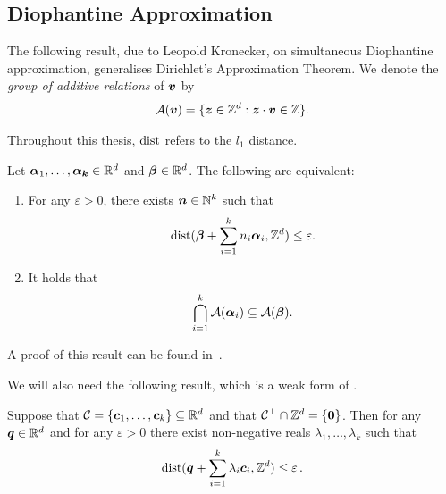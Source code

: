 \subsection{Diophantine Approximation}

The following result, due to Leopold Kronecker, on simultaneous Diophantine approximation, generalises Dirichlet's Approximation Theorem. We denote the \emph{group of additive relations} of $\boldsymbol{v}$ by
\begin{align*}
{\cal{A}}(\boldsymbol{v}) = \lbrace \boldsymbol{z} \in \mathbb{Z}^{d} : \boldsymbol{z} \cdot \boldsymbol{v} \in \mathbb{Z} \rbrace .
\end{align*}

Throughout this thesis, $\operatorname{dist}$ refers to the $l_{1}$ distance.

\begin{theorem}[Kronecker]
\label{thm:Kronecker}
Let $\boldsymbol{\alpha}_{1}, \ldots, \boldsymbol{\alpha_{k}} \in \mathbb{R}^{d}$ and $\boldsymbol{\beta} \in \mathbb{R}^{d}$. The following are equivalent:
\begin{enumerate}
\item For any $\varepsilon > 0$, there exists $\boldsymbol{n} \in \mathbb{N}^{k}$ such that
\begin{align*}
\operatorname{dist}(\boldsymbol{\beta} + \sum\limits_{i=1}^{k} n_{i} \boldsymbol{\alpha}_{i}, \mathbb{Z}^{d}) \leq \varepsilon .
\end{align*}
\item It holds that
\begin{align*}
\bigcap\limits_{i=1}^{k} {\cal{A}}(\boldsymbol{\alpha}_{i}) \subseteq {\cal{A}}(\boldsymbol{\beta}) .
\end{align*}
\end{enumerate}
\end{theorem}

A proof of this result can be found in~\cite{Cassels}.

We will also need the following result, which is a weak form of \cite[Corollary 2.8]{KhachiyanP97}.

\begin{theorem}
  \label{thm:kp-density}
  Suppose that $\mathcal{C} = \lbrace \boldsymbol{c}_{1}, \ldots, \boldsymbol{c}_{k} \rbrace \subseteq \mathbb{R}^{d}$ and that $\mathcal{C}^{\perp} \cap \mathbb{Z}^{d} = \lbrace \boldsymbol{0} \rbrace$. Then for any $\boldsymbol{q} \in \mathbb{R}^{d}$
  and for any $\varepsilon > 0$ there exist non-negative reals $\lambda_{1}, \ldots, \lambda_{k}$ such that
  \begin{equation*}
    \operatorname{dist}(\boldsymbol{q} + \sum\limits_{i=1}^{k} \lambda_{i} \boldsymbol{c}_{i}, \mathbb{Z}^{d}) \leq \varepsilon \, .
  \end{equation*}
\end{theorem}
